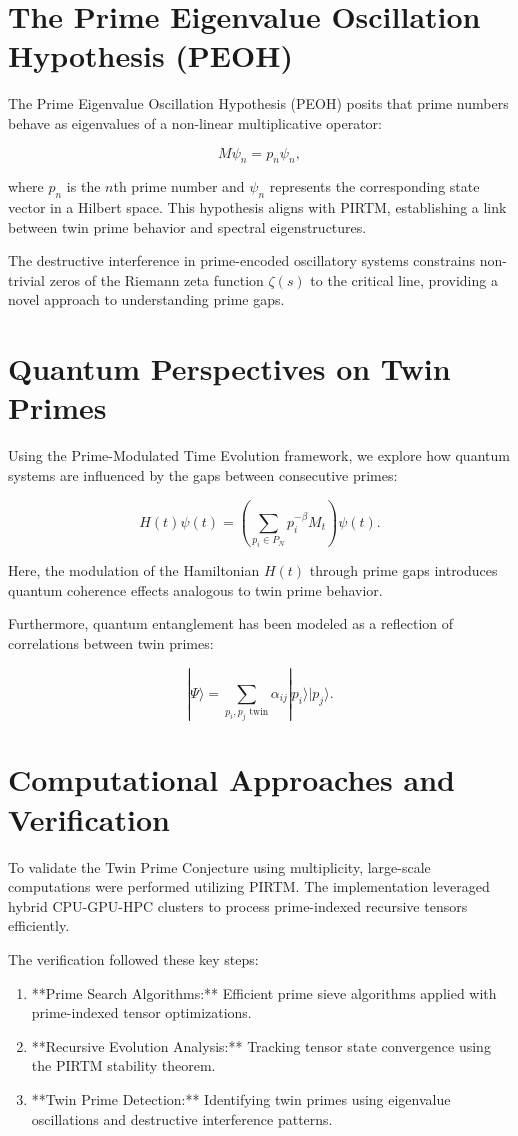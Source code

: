 \documentclass{article}
\theoremstyle{plain}
\theoremstyle{claimstyle}
\begin{document}
\section{The Prime Eigenvalue Oscillation Hypothesis (PEOH)}

The Prime Eigenvalue Oscillation Hypothesis (PEOH) posits that prime numbers behave as eigenvalues of a non-linear multiplicative operator:

\[
M \psi_n = p_n \psi_n,
\]

where \( p_n \) is the \( n \)th prime number and \( \psi_n \) represents the corresponding state vector in a Hilbert space. This hypothesis aligns with PIRTM, establishing a link between twin prime behavior and spectral eigenstructures.

The destructive interference in prime-encoded oscillatory systems constrains non-trivial zeros of the Riemann zeta function \( \zeta(s) \) to the critical line, providing a novel approach to understanding prime gaps.

\section{Quantum Perspectives on Twin Primes}

Using the Prime-Modulated Time Evolution framework, we explore how quantum systems are influenced by the gaps between consecutive primes:

\[
H(t) \psi(t) = \left(\sum_{p_i \in P_N} p_i^{-\beta} M_t \right) \psi(t).
\]

Here, the modulation of the Hamiltonian \( H(t) \) through prime gaps introduces quantum coherence effects analogous to twin prime behavior.

Furthermore, quantum entanglement has been modeled as a reflection of correlations between twin primes:

\[
|\Psi\rangle = \sum_{p_i, p_j \text{ twin}} \alpha_{ij} |p_i\rangle |p_j\rangle.
\]

\section{Computational Approaches and Verification}

To validate the Twin Prime Conjecture using multiplicity, large-scale computations were performed utilizing PIRTM. The implementation leveraged hybrid CPU-GPU-HPC clusters to process prime-indexed recursive tensors efficiently.

The verification followed these key steps:
\begin{enumerate}
    \item **Prime Search Algorithms:** Efficient prime sieve algorithms applied with prime-indexed tensor optimizations.
    \item **Recursive Evolution Analysis:** Tracking tensor state convergence using the PIRTM stability theorem.
    \item **Twin Prime Detection:** Identifying twin primes using eigenvalue oscillations and destructive interference patterns.
\end{enumerate}
\end{document}
